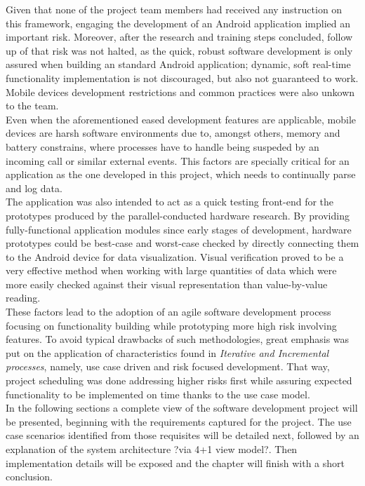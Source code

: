 	Given that none of the project team members had received any instruction on this framework, engaging the development of an Android application implied an important risk. Moreover, after the research and training steps concluded, follow up of that risk was not halted, as the quick, robust software development is only assured when building an standard Android application; dynamic, soft real-time functionality implementation is not discouraged, but also not guaranteed to work.
	Mobile devices development restrictions and common practices were also unkown to the team.\\

	Even when the aforementioned eased development features are applicable, mobile devices are harsh software environments due to, amongst others, memory and battery constrains, where processes have to handle being suspeded by an incoming call or similar external events. This factors are specially critical for an application as the one developed in this project, which needs to continually parse and log data.\\

	The application was also intended to act as a quick testing front-end for the prototypes produced by the parallel-conducted hardware research. By providing fully-functional application modules since early stages of development, hardware prototypes could be best-case and worst-case checked by directly connecting them to the Android device for data visualization. Visual verification proved to be a very effective method when working with large quantities of data which were more easily checked against their visual representation than value-by-value reading.\\

	These factors lead to the adoption of an agile software development process focusing on functionality building while prototyping more high risk involving features. To avoid typical drawbacks of such methodologies, great emphasis was put on the application of characteristics found in \textit{Iterative and Incremental processes}, namely, use case driven and risk focused development. That way, project scheduling was done addressing higher risks first while assuring expected functionality to be implemented on time thanks to the use case model.\\

	In the following sections a complete view of the software development project will be presented, beginning with the requirements captured for the project. The use case scenarios identified from those requisites will be detailed next, followed by an explanation of the system architecture ?via 4+1 view model?. Then implementation details will be exposed and the chapter will finish with a short conclusion.

